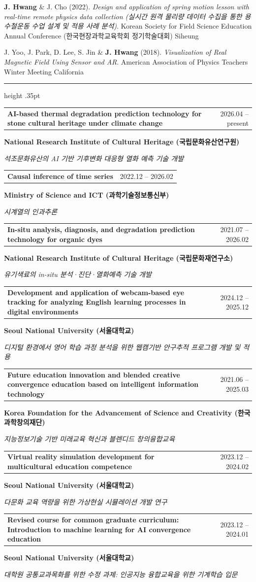 \documentclass[overlapped,line]{res}
\makeatletter
\renewcommand{\sectionfont}{\normalsize\bfseries\scshape\color{cvnavy}}
\renewcommand{\section}[1]{%
  \par\Needspace{4\baselineskip}\addvspace{.105in}%
  \noindent{\sectionfont #1}\par\vspace{.025in}%
  {\color{cvrule}\hrule height .35pt}\vspace{.045in}%
  \nopagebreak[3]}
\newcommand{\cvdate}[1]{{\small\color{cvmuted}#1}}
\newcommand{\cvdetail}[1]{{\small\color{cvmuted}#1}}
\newcommand{\cvorg}[1]{{\small\bfseries\color{cvblue}#1}}
\newenvironment{cvitems}{
  \begin{list}{}{%
      \setlength{\itemsep}{.062in}
      \setlength{\parsep}{0in}
      \setlength{\parskip}{0in}
      \setlength{\topsep}{.025in}
      \setlength{\partopsep}{0in}
      \setlength{\leftmargin}{.12in}
      \setlength{\rightmargin}{0in}}}{\end{list}}
\newenvironment{cvitemscompact}{
  \begin{list}{}{%
      \setlength{\itemsep}{.035in}
      \setlength{\parsep}{0in}
      \setlength{\parskip}{0in}
      \setlength{\topsep}{.018in}
      \setlength{\partopsep}{0in}
      \setlength{\leftmargin}{.12in}
      \setlength{\rightmargin}{0in}}}{\end{list}}
\newcommand{\projectitem}[4]{%
  \item\parbox[t]{\linewidth}{%
    \begin{tabularx}{\linewidth}{@{}Xr@{}}%
      \textbf{#1} & \cvdate{#3}%
    \end{tabularx}\par\vspace{.01in}%
    \cvorg{#4}\par\vspace{.005in}%
    \cvdetail{\textit{#2}}}}
\makeatother
\begin{document}
\begin{resume}
\begin{cvitemscompact}
\item \textbf{J. Hwang} \& J. Cho (2022). \textit{Design and application of spring motion lesson with real-time remote physics data collection (실시간 원격 물리량 데이터 수집을 통한 용수철운동 수업 설계 및 적용 사례 분석)}. Korean Society for Field Science Education Annual Conference (한국현장과학교육학회 정기학술대회) \hfill Siheung
\item \parbox[t]{\linewidth}{J. Yoo, J. Park, D. Lee, S. Jin \& \textbf{J. Hwang} (2018). \textit{Visualization of Real Magnetic Field Using Sensor and AR}. American Association of Physics Teachers Winter Meeting \hfill California}
\end{cvitemscompact}

\section{\sc Research Projects}
\begin{cvitems}
\projectitem{AI-based thermal degradation prediction technology for stone cultural heritage under climate change}{석조문화유산의 AI 기반 기후변화 대응형 열화 예측 기술 개발}{2026.04 -- present}{National Research Institute of Cultural Heritage (국립문화유산연구원)}
\projectitem{Causal inference of time series}{시계열의 인과추론}{2022.12 -- 2026.02}{Ministry of Science and ICT (과학기술정보통신부)}
\projectitem{In-situ analysis, diagnosis, and degradation prediction technology for organic dyes}{유기색료의 in-situ 분석·진단·열화예측 기술 개발}{2021.07 -- 2026.02}{National Research Institute of Cultural Heritage (국립문화재연구소)}
\projectitem{Development and application of webcam-based eye tracking for analyzing English learning processes in digital environments}{디지털 환경에서 영어 학습 과정 분석을 위한 웹캠기반 안구추적 프로그램 개발 및 적용}{2024.12 -- 2025.12}{Seoul National University (서울대학교)}
\projectitem{Future education innovation and blended creative convergence education based on intelligent information technology}{지능정보기술 기반 미래교육 혁신과 블렌디드 창의융합교육}{2021.06 -- 2025.03}{Korea Foundation for the Advancement of Science and Creativity (한국과학창의재단)}
\projectitem{Virtual reality simulation development for multicultural education competence}{다문화 교육 역량을 위한 가상현실 시뮬레이션 개발 연구}{2023.12 -- 2024.02}{Seoul National University (서울대학교)}
\projectitem{Revised course for common graduate curriculum: Introduction to machine learning for AI convergence education}{대학원 공통교과목화를 위한 수정 과제: 인공지능 융합교육을 위한 기계학습 입문}{2023.12 -- 2024.01}{Seoul National University (서울대학교)}

\end{cvitems}
\end{resume}
\end{document}
